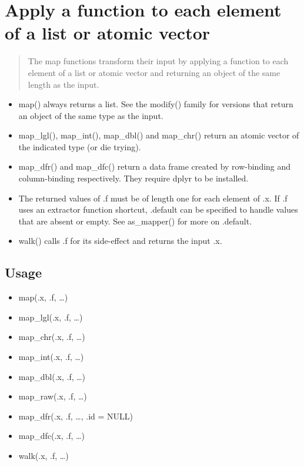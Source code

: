 \documentclass[
]{book}
\begin{document}
\hypertarget{apply-a-function-to-each-element-of-a-list-or-atomic-vector}{%
\section{Apply a function to each element of a list or atomic vector}\label{apply-a-function-to-each-element-of-a-list-or-atomic-vector}}

\begin{quote}
The map functions transform their input by applying a function to each element of a list or atomic vector and returning an object of the same length as the input.
\end{quote}

\begin{itemize}
\item
  map() always returns a list. See the modify() family for versions that return an object of the same type as the input.
\item
  map\_lgl(), map\_int(), map\_dbl() and map\_chr() return an atomic vector of the indicated type (or die trying).
\item
  map\_dfr() and map\_dfc() return a data frame created by row-binding and column-binding respectively. They require dplyr to be installed.
\item
  The returned values of .f must be of length one for each element of .x. If .f uses an extractor function shortcut, .default can be specified to handle values that are absent or empty. See as\_mapper() for more on .default.
\item
  walk() calls .f for its side-effect and returns the input .x.
\end{itemize}

\hypertarget{usage}{%
\subsection{Usage}\label{usage}}

\begin{itemize}
\item
  map(.x, .f, \ldots)
\item
  map\_lgl(.x, .f, \ldots)
\item
  map\_chr(.x, .f, \ldots)
\item
  map\_int(.x, .f, \ldots)
\item
  map\_dbl(.x, .f, \ldots)
\item
  map\_raw(.x, .f, \ldots)
\item
  map\_dfr(.x, .f, \ldots, .id = NULL)
\item
  map\_dfc(.x, .f, \ldots)
\item
  walk(.x, .f, \ldots)
\end{itemize}
\end{document}
